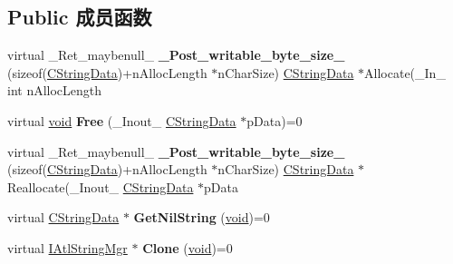 \subsection*{Public 成员函数}
\begin{DoxyCompactItemize}
\item 
\mbox{\label{class_a_t_l_1_1_i_atl_string_mgr_aa50501fc897e1c407afa7342e43af7df}} 
virtual \+\_\+\+Ret\+\_\+maybenull\+\_\+ {\bfseries \+\_\+\+Post\+\_\+writable\+\_\+byte\+\_\+size\+\_\+} (sizeof(\hyperlink{struct_a_t_l_1_1_c_string_data}{C\+String\+Data})+n\+Alloc\+Length $\ast$n\+Char\+Size) \hyperlink{struct_a_t_l_1_1_c_string_data}{C\+String\+Data} $\ast$Allocate(\+\_\+\+In\+\_\+ int n\+Alloc\+Length
\item 
\mbox{\label{class_a_t_l_1_1_i_atl_string_mgr_a15643eddf3b4efcb24f38c1f65374e5e}} 
virtual \hyperlink{interfacevoid}{void} {\bfseries Free} (\+\_\+\+Inout\+\_\+ \hyperlink{struct_a_t_l_1_1_c_string_data}{C\+String\+Data} $\ast$p\+Data)=0
\item 
\mbox{\label{class_a_t_l_1_1_i_atl_string_mgr_a9c40d9d6a56f5b55f35b87ee3e32fa40}} 
virtual \+\_\+\+Ret\+\_\+maybenull\+\_\+ {\bfseries \+\_\+\+Post\+\_\+writable\+\_\+byte\+\_\+size\+\_\+} (sizeof(\hyperlink{struct_a_t_l_1_1_c_string_data}{C\+String\+Data})+n\+Alloc\+Length $\ast$n\+Char\+Size) \hyperlink{struct_a_t_l_1_1_c_string_data}{C\+String\+Data} $\ast$Reallocate(\+\_\+\+Inout\+\_\+ \hyperlink{struct_a_t_l_1_1_c_string_data}{C\+String\+Data} $\ast$p\+Data
\item 
\mbox{\label{class_a_t_l_1_1_i_atl_string_mgr_a8b17d1ab3c0dbbe65871fad62d095d0d}} 
virtual \hyperlink{struct_a_t_l_1_1_c_string_data}{C\+String\+Data} $\ast$ {\bfseries Get\+Nil\+String} (\hyperlink{interfacevoid}{void})=0
\item 
\mbox{\label{class_a_t_l_1_1_i_atl_string_mgr_a9c42c1e15891bf4e6df71822f00d8fd6}} 
virtual \hyperlink{class_a_t_l_1_1_i_atl_string_mgr}{I\+Atl\+String\+Mgr} $\ast$ {\bfseries Clone} (\hyperlink{interfacevoid}{void})=0
\end{DoxyCompactItemize}
